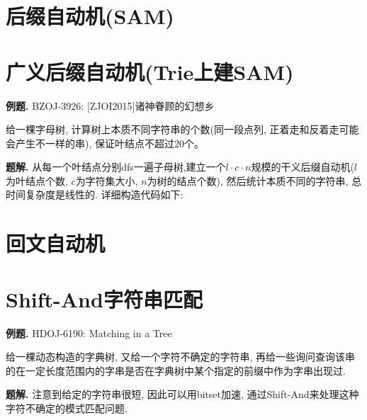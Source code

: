\section{后缀自动机(SAM)}


\section{广义后缀自动机(Trie上建SAM)}
\textbf{例题.}
BZOJ-3926: [ZJOI2015]诸神眷顾的幻想乡

给一棵字母树, 计算树上本质不同字符串的个数(同一段点列, 正着走和反着走可能会产生不一样的串), 保证叶结点不超过$20$个。

\textbf{题解.}
从每一个叶结点分别dfs一遍子母树,建立一个$l \cdot c \cdot n$规模的干义后缀自动机($l$为叶结点个数, $c$为字符集大小, $n$为树的结点个数), 然后统计本质不同的字符串, 总时间复杂度是线性的.
详细构造代码如下:


\section{回文自动机}


\section{Shift-And字符串匹配}
\textbf{例题.}
HDOJ-6190: Matching in a Tree

给一棵动态构造的字典树, 又给一个字符不确定的字符串, 再给一些询问查询该串的在一定⻓度范围内的字串是否在字典树中某个指定的前缀中作为字串出现过.

\textbf{题解.}
注意到给定的字符串很短, 因此可以用bitset加速, 通过Shift-And来处理这种字符不确定的模式匹配问题.

